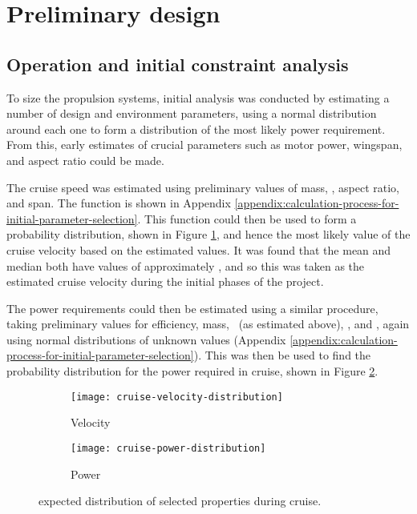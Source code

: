 \documentclass[../../main.tex]{subfiles}
\begin{document}

\section{Preliminary design} \label{sec:design-process:preliminary-design}

\subsection{Operation and initial constraint analysis} \label{sec:design-process:preliminary-design:operation-and-initial-constraint-analysis}

To size the propulsion systems, initial analysis was conducted by estimating a number of design and environment parameters, using a normal distribution around each one to form a distribution of the most likely power requirement.
From this, early estimates of crucial parameters such as motor power, wingspan, and aspect ratio could be made.

The cruise speed was estimated using preliminary values of mass, \cl, aspect ratio, and span.
The function is shown in Appendix \ref{appendix:calculation-process-for-initial-parameter-selection}.
This function could then be used to form a probability distribution, shown in Figure \ref{fig:cruise-distribution:velocity}, and hence the most likely value of the cruise velocity based on the estimated values.
It was found that the mean and median both have values of approximately , and so this was taken as the estimated cruise velocity during the initial phases of the project. 

The power requirements could then be estimated using a similar procedure, taking preliminary values for efficiency, mass, \vcruise \, (as estimated above), \cl, and \cd, again using normal distributions of unknown values (Appendix \ref{appendix:calculation-process-for-initial-parameter-selection}).
This was then be used to find the probability distribution for the power required in cruise, shown in Figure \ref{fig:cruise-distribution:power}.

\begin{figure}[H]
    \centering
    \begin{subfigure}[b]{0.49\columnwidth}
        \centering
        \texttt{[image: cruise-velocity-distribution]}
        \caption{Velocity}
        \label{fig:cruise-distribution:velocity}
    \end{subfigure}
    \hfill
    \begin{subfigure}[b]{0.49\columnwidth}
        \centering
        \texttt{[image: cruise-power-distribution]}
        \caption{Power}
        \label{fig:cruise-distribution:power}
    \end{subfigure}

    \caption{expected distribution of selected properties during cruise.}
    \label{fig:cruise-distribution}
\end{figure}
\end{document}
